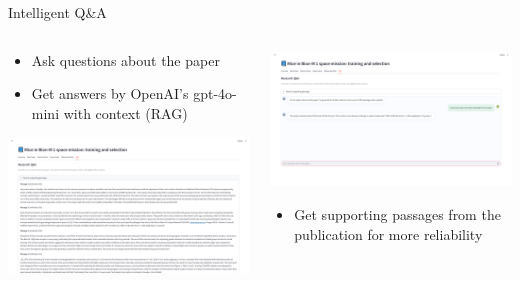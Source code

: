 \documentclass[t,aspectratio=169]{beamer}
\begin{document}
\begin{frame}{Intelligent Q\&A}
	\begin{columns}[T]
		\begin{column}{.48\textwidth}
            \begin{itemize}
                \item Ask questions about the paper
                \item Get answers by OpenAI's gpt-4o-mini with context (RAG)
            \end{itemize}
            \vskip5pt
            \includegraphics[width=\textwidth]{images/2_2_reliability.png}
        \end{column}
		\begin{column}{.48\textwidth}
            \includegraphics[width=\textwidth]{images/2_1_chat.png}
            \begin{itemize}
                \item Get supporting passages from the publication for more reliability
            \end{itemize}
        \end{column}
    \end{columns}
\end{frame}
\end{document}
